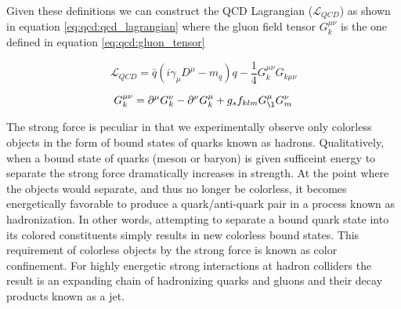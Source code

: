 Given these definitions we can construct the QCD Lagrangian
($\mathcal{L}_{QCD}$) as shown in equation \ref{eq:qcd:qcd_lagrangian} where the
gluon field tensor $G_{k}^{\mu\nu}$ is the one defined in equation
\ref{eq:qcd:gluon_tensor}

\begin{equation} \label{eq:qcd:qcd_lagrangian}
\mathcal{L}_{QCD} = \bar{q}(i\gamma_{\mu}D^{\mu} - m_{q})q -
\frac{1}{4}G_{k}^{\mu\nu}G_{k\mu\nu}
\end{equation}

\begin{equation} \label{eq:qcd:gluon_tensor}
G_{k}^{\mu\nu} = \partial^{\mu}G_{k}^{\nu} - \partial^{\nu}G_{k}^{\mu} +
g_{s}f_{klm}G_{\l}^{\mu}G_{m}^{\nu}
\end{equation}

The strong force is peculiar in that we experimentally observe only colorless
objects in the form of bound states of quarks known as hadrons.  Qualitatively,
when a bound state of quarks (meson or baryon) is given sufficeint energy to
separate the strong force dramatically increases in strength.  At the point
where the objects would separate, and thus no longer be colorless, it becomes
energetically favorable to produce a quark/anti-quark pair in a process known as
hadronization.  In other words, attempting to separate a bound quark state into
its colored constituents simply results in new colorless bound states.  This
requirement of colorless objects by the strong force is known as color
confinement. For highly energetic strong interactions at hadron colliders the
result is an expanding chain of hadronizing quarks and gluons and their decay
products known as a jet.

